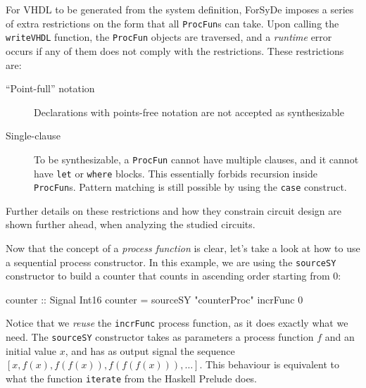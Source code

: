 \documentclass[a4paper]{article}
\begin{document}
                For VHDL to be generated from the system definition, ForSyDe imposes a series
                of extra restrictions on the form that all \texttt{ProcFun}s can take. Upon calling
                the \texttt{writeVHDL} function, the \texttt{ProcFun} objects are traversed, and a
                \emph{runtime} error occurs if any of them does not comply with the restrictions.
                These restrictions are:

                \begin{description}
                    \item[``Point-full'' notation] Declarations with points-free notation are not
                        accepted as synthesizable
                    \item[Single-clause] To be synthesizable, a \texttt{ProcFun} cannot have
                        multiple clauses, and it cannot have \texttt{let} or \texttt{where} blocks.
                        This essentially forbids recursion inside \texttt{ProcFun}s. Pattern
                        matching is still possible by using the \texttt{case} construct.
                \end{description}

                Further details on these restrictions and how they constrain circuit design are
                shown further ahead, when analyzing the studied circuits.

                Now that the concept of a \emph{process function} is clear, let's take a look at how
                to use a sequential process constructor. In this example, we are using the
                \texttt{sourceSY} constructor to build a counter that counts in ascending order
                starting from 0:

                \begin{haskellcode}
        counter :: Signal Int16
        counter = sourceSY "counterProc" incrFunc 0
                \end{haskellcode}

                Notice that we \emph{reuse} the \texttt{incrFunc} process function, as it does
                exactly what we need. The \texttt{sourceSY} constructor takes as parameters a process
                function $f$ and an initial value $x$, and has as output signal the sequence
                $ [x, f(x), f(f(x)), f(f(f(x))), \ldots] $. This behaviour is equivalent to what the
                function \texttt{iterate} from the Haskell Prelude does.
\end{document}
